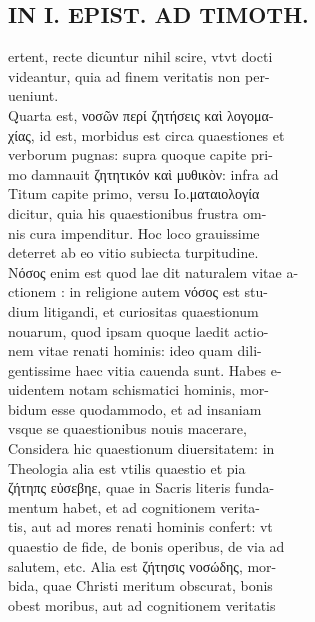 \documentclass{article}
\begin{document}
\begin{pages}
\section*{IN I. EPIST. AD TIMOTH. \\
                }ertent, recte dicuntur nihil scire, vtvt docti \\
                videantur, quia ad finem veritatis non per- \\
                ueniunt. \\
                Quarta est, νοσῶν περί ζητήσεις καὶ λογομα- \\
                χίας, id est, morbidus est circa quaestiones et \\
                verborum pugnas: supra quoque capite pri- \\
                mo damnauit ζητητικόν καὶ μυθικὸν: infra ad \\
                Titum capite primo, versu Io.ματαιολογία \\
                dicitur, quia his quaestionibus frustra om- \\
                nis cura impenditur. Hoc loco grauissime \\
                deterret ab eo vitio subiecta turpitudine. \\
                Νόσος  enim est quod lae dit naturalem vitae a- \\
                ctionem : in religione autem νόσος est stu- \\
                dium litigandi, et curiositas quaestionum \\
                nouarum, quod ipsam quoque laedit actio- \\
                nem vitae renati hominis: ideo quam dili- \\
                gentissime haec vitia cauenda sunt. Habes e- \\
                uidentem notam schismatici hominis, mor- \\
                bidum esse quodammodo, et ad insaniam \\
                vsque se quaestionibus nouis macerare, \\
                Considera hic quaestionum diuersitatem: in \\
                Theologia alia est vtilis quaestio et pia \\
                ζήτηπς εὐσεβηε, quae in Sacris literis funda- \\
                mentum habet, et ad cognitionem verita- \\
                tis, aut ad mores renati hominis confert: vt \\
                quaestio de fide, de bonis operibus, de via ad \\
                salutem, etc. Alia est ζήτησις νοσώδης, mor- \\
                bida, quae Christi meritum obscurat, bonis \\
                obest moribus, aut ad cognitionem veritatis \\
                

\end{pages}
\end{document}
